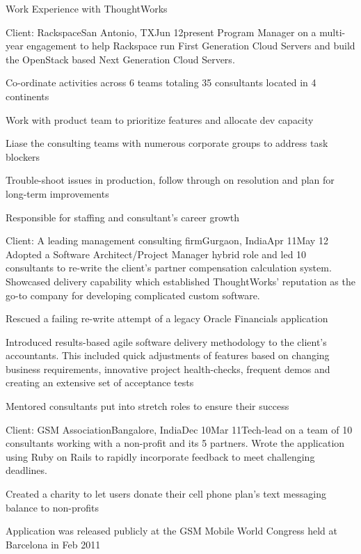 \documentclass{resume} %
\begin{document}
\begin{rSection}{Work Experience with ThoughtWorks}

\begin{rSubsection}{Client: Rackspace}{San Antonio, TX}{Jun
    12}{present}
{Program Manager on a multi-year engagement to help Rackspace run
  First Generation Cloud Servers and build the OpenStack based Next
  Generation Cloud Servers.}

\item Co-ordinate activities across 6 teams
  totaling 35 consultants located in 4 continents
\item Work with product team to prioritize features and allocate dev capacity
\item Liase the consulting teams with numerous corporate groups to address task blockers
\item Trouble-shoot issues in production, follow
  through on resolution and plan for long-term improvements
\item Responsible for staffing and consultant's career growth
\end{rSubsection}


\begin{rSubsection}{Client: A leading management consulting
    firm}{Gurgaon, India}{Apr 11}{May 12}
{Adopted a Software Architect/Project Manager hybrid role and led 10 consultants to re-write the
  client's partner compensation calculation system. Showcased delivery
  capability which established ThoughtWorks' reputation as the go-to company for developing complicated custom software.}

\item Rescued a failing re-write attempt of a legacy Oracle Financials
  application
\item Introduced results-based agile software delivery
  methodology to the client's accountants. This included quick
  adjustments of features based on changing business requirements, innovative
  project health-checks, frequent demos and creating an extensive set
  of acceptance tests
\item Mentored consultants put into stretch roles to ensure their
  success
\end{rSubsection}


\begin{rSubsection}{Client: GSM Association}{Bangalore, India}{Dec 10}{Mar 11}{Tech-lead on a team of 10 consultants working with a non-profit
  and its 5 partners. Wrote the application using Ruby on Rails to
  rapidly incorporate feedback to meet challenging deadlines.}
\item Created a charity to let users donate their cell phone plan's text messaging
  balance to non-profits
\item Application was released publicly at the GSM Mobile World Congress held at Barcelona in Feb 2011
\end{rSubsection}



\end{rSection}
\end{document}
